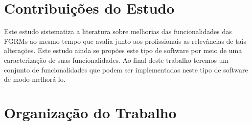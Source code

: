 \section{Contribuições do Estudo}
\label{sec:intro-contribuicao}
Este estudo sistematiza a literatura sobre melhorias das funcionalidades das
FGRMs ao mesmo tempo que avalia junto aos profissionais as relevâncias de tais
alterações. Este estudo ainda se propões este tipo de software por meio de uma
caracterização de suas funcionalidades. Ao final deste trabalho teremos um
conjunto de funcionalidades que podem ser implementadas neste tipo de software
de modo melhorá-lo.

\section{Organização do Trabalho}
\label{sec:intro-organizacao-dissertacao}
\todoend
